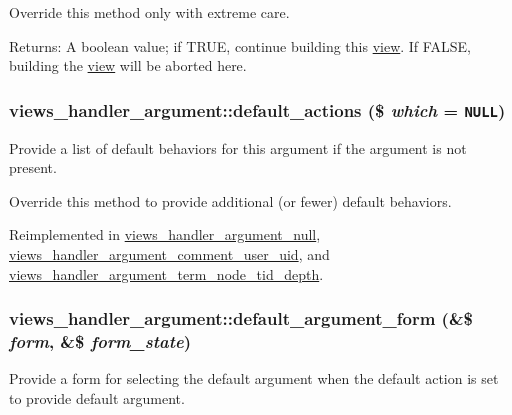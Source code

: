 Override this method only with extreme care.

\begin{Desc}
\item[Returns:]A boolean value; if TRUE, continue building this \hyperlink{classview}{view}. If FALSE, building the \hyperlink{classview}{view} will be aborted here. \end{Desc}
\hypertarget{classviews__handler__argument_bf38ef334b6e18e0aa43e5a829e3ce33}{
\subsubsection[{default\_\-actions}]{\setlength{\rightskip}{0pt plus 5cm}views\_\-handler\_\-argument::default\_\-actions (\$ {\em which} = {\tt NULL})}}
\label{classviews__handler__argument_bf38ef334b6e18e0aa43e5a829e3ce33}


Provide a list of default behaviors for this argument if the argument is not present.

Override this method to provide additional (or fewer) default behaviors. 

Reimplemented in \hyperlink{classviews__handler__argument__null_82da8fd1448e1ce346aa38d5b6021e05}{views\_\-handler\_\-argument\_\-null}, \hyperlink{classviews__handler__argument__comment__user__uid_492e0d7daafffc95f6ac936111556559}{views\_\-handler\_\-argument\_\-comment\_\-user\_\-uid}, and \hyperlink{classviews__handler__argument__term__node__tid__depth_507f5facd0421728d2d0a5f350839dfc}{views\_\-handler\_\-argument\_\-term\_\-node\_\-tid\_\-depth}.\hypertarget{classviews__handler__argument_830cb037bee2daa385618a60d01c0dd1}{
\subsubsection[{default\_\-argument\_\-form}]{\setlength{\rightskip}{0pt plus 5cm}views\_\-handler\_\-argument::default\_\-argument\_\-form (\&\$ {\em form}, \/  \&\$ {\em form\_\-state})}}
\label{classviews__handler__argument_830cb037bee2daa385618a60d01c0dd1}


Provide a form for selecting the default argument when the default action is set to provide default argument. 

